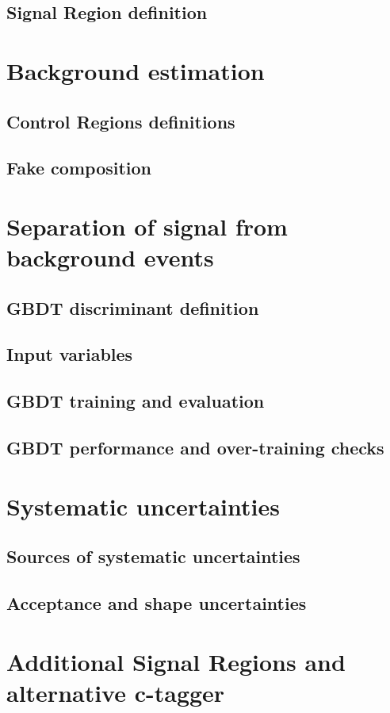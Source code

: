 \subsection {Signal Region definition}


\clearpage
\section{Background estimation}
\clearpage
\subsection {Control Regions definitions}
\clearpage
\subsection {Fake composition}



\clearpage
\section{Separation of signal from background events}
\clearpage
\subsection {GBDT discriminant definition}
\clearpage
\subsection {Input variables}
\clearpage
\subsection {GBDT training and evaluation}
\clearpage
\subsection {GBDT performance and over-training checks }


\clearpage
\section{Systematic uncertainties}
\clearpage
\subsection {Sources of systematic uncertainties}
\clearpage
\subsection {Acceptance and shape uncertainties}

\clearpage
\section {Additional Signal Regions and alternative c-tagger}
\clearpage

